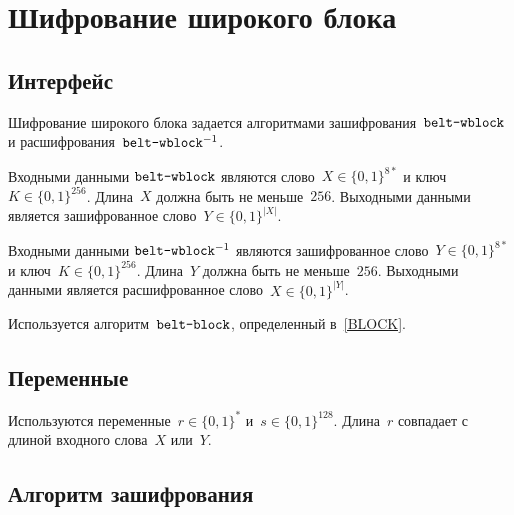 \section{Шифрование широкого блока}\label{WBLOCK}

\subsection{Интерфейс}\label{WBLOCK.IFace}

Шифрование широкого блока задается алгоритмами зашифрования~$\texttt{belt-wblock}$
и расшифрования~$\texttt{belt-wblock}^{-1}$.

Входными данными $\texttt{belt-wblock}$ являются слово~$X\in\{0,1\}^{8*}$ 
и ключ~$K\in\{0,1\}^{256}$. Длина~$X$ должна быть не меньше~$256$.
%
Выходными данными является зашифрованное слово~$Y\in\{0,1\}^{|X|}$.

Входными данными $\texttt{belt-wblock}^{-1}$ являются зашифрованное слово~$Y\in\{0,1\}^{8*}$ 
и ключ~$K\in\{0,1\}^{256}$. Длина~$Y$ должна быть не меньше~$256$.
%
Выходными данными является расшифрованное слово~$X\in\{0,1\}^{|Y|}$.

Используется алгоритм~$\texttt{belt-block}$, определенный в~\ref{BLOCK}.

\subsection{Переменные}\label{WBLOCK.Vars}

Используются переменные~$r\in\{0,1\}^*$ и~$s\in\{0,1\}^{128}$.
Длина~$r$ совпадает с длиной входного слова~$X$ или~$Y$.

\subsection{Алгоритм зашифрования}\label{WBLOCK.Encr}

